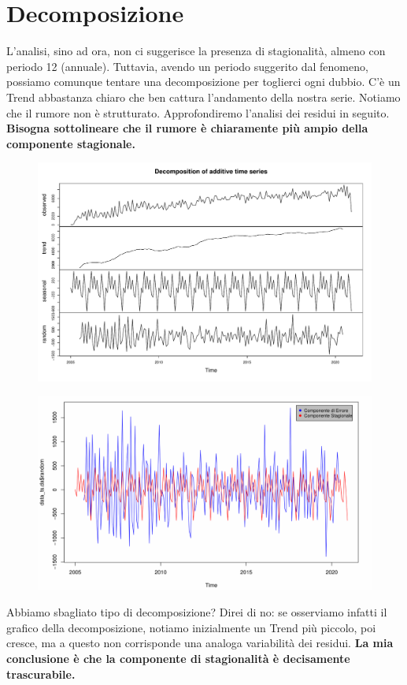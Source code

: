 \documentclass[11pt,a4paper]{article}
\begin{document}
\section{Decomposizione}
L'analisi, sino ad ora, non ci suggerisce la presenza di stagionalit\`a, almeno
con periodo 12 (annuale). Tuttavia, avendo un periodo suggerito dal fenomeno,
possiamo comunque tentare una decomposizione per toglierci ogni dubbio.
C'\`e un Trend abbastanza chiaro che ben cattura l'andamento della nostra serie.
Notiamo che il rumore non \`e strutturato. Approfondiremo l'analisi dei residui
in seguito. \textbf{Bisogna sottolineare che il rumore \`e chiaramente pi\`u
ampio della componente stagionale.}
\clearpage
\begin{figure}[H]
	\vspace{-1.5cm}
	\hspace{-1.5cm}
	\includegraphics[scale=0.7]{imgs/decompose_additive.pdf}
	\vspace{-0.9cm}
\end{figure}
\begin{figure}[H]
	\vspace{-0.9cm}
	\hspace{-1.5cm}
	\includegraphics[scale=0.7]{imgs/random_seasonal.pdf}
	\vspace{-0.9cm}
\end{figure}
\noindent
Abbiamo sbagliato tipo di decomposizione? Direi di no: se osserviamo infatti il
grafico della decomposizione, notiamo  inizialmente un Trend pi\`u piccolo, poi
cresce, ma a questo non corrisponde una analoga variabilit\`a dei residui.
\textbf{La mia conclusione \`e che la componente di stagionalit\`a \`e
decisamente trascurabile.}
\end{document}
